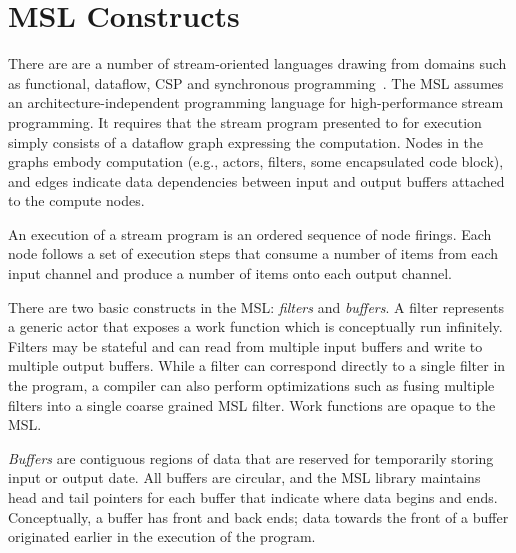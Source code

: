 \section{MSL Constructs}

There are are a number of stream-oriented languages drawing from
domains such as functional, dataflow, CSP and synchronous
programming~\cite{survey97}. The MSL assumes an architecture-independent
programming language for high-performance stream programming. It
requires that the stream program presented to for execution simply
consists of a dataflow graph expressing the computation. Nodes in the
graphs embody computation (e.g., actors, filters, some encapsulated
code block), and edges indicate data dependencies between
input and output buffers attached to the compute nodes.

An execution of a stream program is an ordered sequence of node
firings. Each node follows a set of execution steps that consume a
number of items from each input channel and produce a number of items
onto each output channel.

There are two basic constructs in the MSL: \emph{filters} and
\emph{buffers}. A filter represents a generic actor that exposes a
work function which is conceptually run infinitely. Filters may be
stateful and can read from multiple input buffers and write to multiple
output buffers. While a filter can correspond directly to a
single filter in the program, a compiler can also perform
optimizations such as fusing multiple filters into a single
coarse grained MSL filter. Work functions are opaque to the MSL.

\emph{Buffers} are contiguous regions of data that are reserved for
temporarily storing input or output date. All buffers are circular,
and the MSL library maintains head and tail pointers for each buffer
that indicate where data begins and ends. Conceptually, a buffer has
front and back ends; data towards the front of a buffer originated
earlier in the execution of the program.

